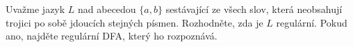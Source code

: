 \documentclass[a4paper,12pt]{amsart}
\begin{document}
\medskip\begin{problem}
    
   Uvažme jazyk $L$ nad abecedou $\{a,b\}$ sestávající ze všech slov, která neobsahují trojici po sobě jdoucích stejných písmen. Rozhodněte, zda je $L$ regulární. Pokud ano, najděte regulární DFA, který ho rozpoznává.

\end{problem}
\end{document}
